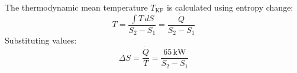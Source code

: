 The thermodynamic mean temperature \( T_{\text{KF}} \) is calculated using entropy change:  
\[
T = \frac{\int T \, dS}{S_2 - S_1} = \frac{\dot{Q}}{S_2 - S_1}
\]  
Substituting values:  
\[
\Delta S = \frac{\dot{Q}}{T} = \frac{65 \, \text{kW}}{S_2 - S_1}
\]